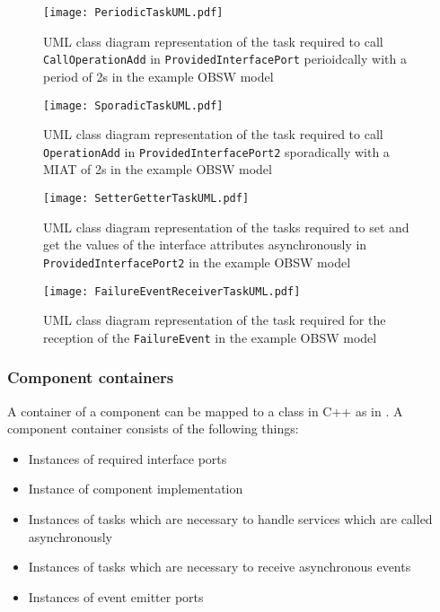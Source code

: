 \begin{figure}[h]
	\centering
	\texttt{[image: PeriodicTaskUML.pdf]}
	\caption{UML class diagram representation of the task required to call \texttt{CallOperationAdd} in \texttt{Provided\allowbreak Interface\allowbreak Port} perioidcally with a period of 2s in the example OBSW model}
	\label{fig: Periodic task UML}
\end{figure}

\begin{figure}[h]
	\centering
	\texttt{[image: SporadicTaskUML.pdf]}
	\caption{UML class diagram representation of the task required to call \texttt{OperationAdd} in \texttt{Provided\allowbreak Interface\allowbreak Port2} sporadically with a MIAT of 2s in the example OBSW model}
	\label{fig: Sporadic task UML}
\end{figure}

\begin{figure}[h]
	\centering
	\texttt{[image: SetterGetterTaskUML.pdf]}
	\caption{UML class diagram representation of the tasks required to set and get the values of the interface attributes asynchronously in \texttt{Provided\allowbreak Interface\allowbreak Port2} in the example OBSW model}
	\label{fig: Status value getter setter task UML}
\end{figure}

\begin{figure}[h]
	\centering
	\texttt{[image: FailureEventReceiverTaskUML.pdf]}
	\caption{UML class diagram representation of the task required for the reception of the \texttt{Failure\allowbreak Event} in the example OBSW model}
	\label{fig: Event receiver task UML}
\end{figure}

\subsubsection{\textbf{Component containers}}
A container of a component can be mapped to a class in C++ as in \cite{EvoRAVCodeAr}. A component container consists of the following things:

\begin{itemize}
\item Instances of required interface ports
\item Instance of component implementation 
\item Instances of tasks which are necessary to handle services which are called asynchronously 
\item Instances of tasks which are necessary to receive asynchronous events
\item Instances of event emitter ports
\end{itemize}

